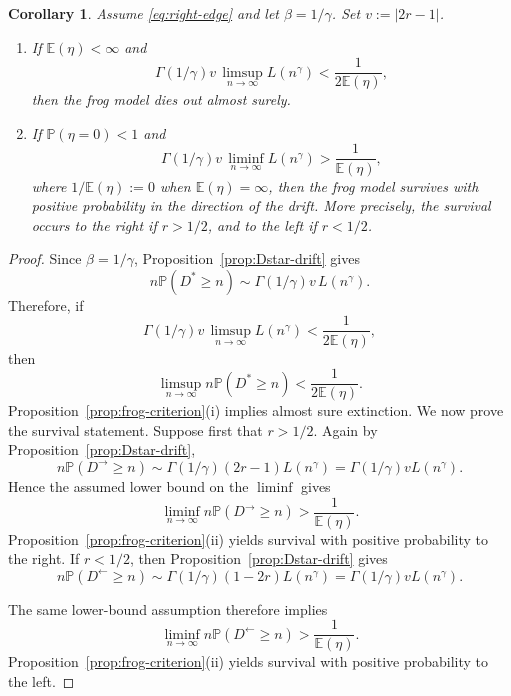 \documentclass[reqno,final,11pt]{amsart}
\newcommand{\E}{\mathbb E}
\newcommand{\Pbb}{\mathbb P}
\theoremstyle{plain}
\newtheorem{corollary}[theorem]{Corollary}
\theoremstyle{definition}
\theoremstyle{remark}
\numberwithin{equation}{section}
\begin{document}
\begin{corollary}\label{cor:critical-drift-weibull}
 Assume \eqref{eq:right-edge} and let \(\beta=1/\gamma\). Set
 \(v:=|2r-1|\).
 \begin{enumerate}[label=\textup{(\roman*)}]
 \item If \(\E(\eta)<\infty\) and
 \[
   \Gamma(1/\gamma)v\,
   \limsup_{n\to\infty} L(n^\gamma)
   <
   \frac{1}{2\E(\eta)},
 \]
 then the frog model dies out almost surely.
 \item If \(\Pbb(\eta=0)<1\) and
 \[
   \Gamma(1/\gamma)v\,
   \liminf_{n\to\infty} L(n^\gamma)
   >
   \frac{1}{\E(\eta)},
 \]
 where \(1/\E(\eta):=0\) when \(\E(\eta)=\infty\), then the frog model survives
 with positive probability in the direction of the drift. More precisely, the
 survival occurs to the right if \(r>1/2\), and to the left if \(r<1/2\).
 \end{enumerate}
 \end{corollary}
 \begin{proof}
 Since \(\beta=1/\gamma\), Proposition~\ref{prop:Dstar-drift} gives
 \[
   n\Pbb(D^*\ge n)
   \sim
   \Gamma(1/\gamma)v\,L(n^\gamma).
 \]
 Therefore, if
 \[
   \Gamma(1/\gamma)v\,
   \limsup_{n\to\infty}L(n^\gamma)
   <
   \frac{1}{2\E(\eta)},
\] then \[
   \limsup_{n\to\infty} n\Pbb(D^*\ge n)
   <
   \frac{1}{2\E(\eta)}.
 \]
 Proposition~\ref{prop:frog-criterion}\textup{(i)} implies almost sure
 extinction.
 We now prove the survival statement. Suppose first that \(r>1/2\). Again by
 Proposition~\ref{prop:Dstar-drift},
 \[
   n\Pbb(D^\to\ge n)
   \sim
   \Gamma(1/\gamma)(2r-1)L(n^\gamma)
   =
   \Gamma(1/\gamma)vL(n^\gamma).
 \]
 Hence the assumed lower bound on the \(\liminf\) gives
 \[
   \liminf_{n\to\infty}n\Pbb(D^\to\ge n)
   >
   \frac{1}{\E(\eta)}.
 \]
 Proposition~\ref{prop:frog-criterion}\textup{(ii)} yields survival with
 positive probability to the right.
 If \(r<1/2\), then Proposition~\ref{prop:Dstar-drift} gives
 \[
   n\Pbb(D^\leftarrow\ge n)
   \sim
   \Gamma(1/\gamma)(1-2r)L(n^\gamma)
   =
   \Gamma(1/\gamma)vL(n^\gamma).
 \]

The same lower-bound assumption therefore implies
\[
  \liminf_{n\to\infty}n\Pbb(D^\leftarrow\ge n)
  >
  \frac{1}{\E(\eta)}.
\]
Proposition~\ref{prop:frog-criterion}\textup{(ii)} yields survival with
positive probability to the left.
\end{proof}
\end{document}
